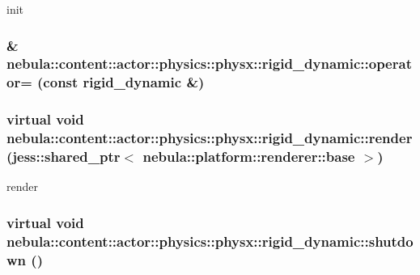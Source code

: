 init \hypertarget{classnebula_1_1content_1_1actor_1_1physics_1_1physx_1_1rigid__dynamic_a956e5d0fadb4b75aa03e99991c84c445}{
\subsubsection[{operator=}]{\& nebula::content::actor::physics::physx::rigid\_\-dynamic::operator= (const {\bf rigid\_\-dynamic} \&)}}
\label{classnebula_1_1content_1_1actor_1_1physics_1_1physx_1_1rigid__dynamic_a956e5d0fadb4b75aa03e99991c84c445}
\hypertarget{classnebula_1_1content_1_1actor_1_1physics_1_1physx_1_1rigid__dynamic_aeb4e0304888f8b4d3fdbebc61eb8a031}{
\subsubsection[{render}]{\setlength{\rightskip}{0pt plus 5cm}virtual void nebula::content::actor::physics::physx::rigid\_\-dynamic::render (jess::shared\_\-ptr$<$ {\bf nebula::platform::renderer::base} $>$)}}
\label{classnebula_1_1content_1_1actor_1_1physics_1_1physx_1_1rigid__dynamic_aeb4e0304888f8b4d3fdbebc61eb8a031}


render \hypertarget{classnebula_1_1content_1_1actor_1_1physics_1_1physx_1_1rigid__dynamic_a88a75a1eae5e774c51f6b2afd2cb70e6}{
\subsubsection[{shutdown}]{\setlength{\rightskip}{0pt plus 5cm}virtual void nebula::content::actor::physics::physx::rigid\_\-dynamic::shutdown ()}}
\label{classnebula_1_1content_1_1actor_1_1physics_1_1physx_1_1rigid__dynamic_a88a75a1eae5e774c51f6b2afd2cb70e6}


